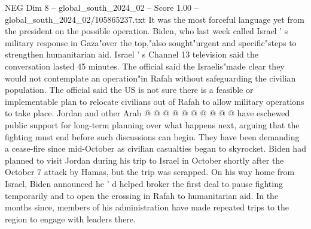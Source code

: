 \begin{textsample}{NEG Dim 8 – global\_south\_2024\_02 – Score 1.00 – global\_south\_2024\_02/105865237.txt}
It was the most forceful language yet from the president on the possible operation.
Biden, who last week called Israel ' s military response in Gaza"over the top,"also sought"urgent and specific"steps to strengthen humanitarian aid.
Israel ' s Channel 13 television said the conversation lasted 45 minutes.
The official said the Israelis"made clear they would not contemplate an operation"in Rafah without safeguarding the civilian population.
The official said the US is not sure there is a feasible or implementable plan to relocate civilians out of Rafah to allow military operations to take place.
Jordan and other Arab @ @ @ @ @ @ @ @ @ @ have eschewed public support for long-term planning over what happens next, arguing that the fighting must end before such discussions can begin.
They have been demanding a cease-fire since mid-October as civilian casualties began to skyrocket.
Biden had planned to visit Jordan during his trip to Israel in October shortly after the October 7 attack by Hamas, but the trip was scrapped.
On his way home from Israel, Biden announced he ' d helped broker the first deal to pause fighting temporarily and to open the crossing in Rafah to humanitarian aid.
In the months since, members of his administration have made repeated trips to the region to engage with leaders there.

\end{textsample}
